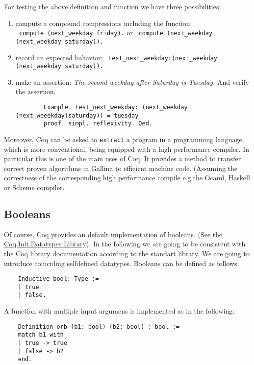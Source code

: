   For testing the above definition and function we have three possibilities:   
   \begin{enumerate}
   \item compute a compound compressions including the function:\\
   \lstinline! compute (next_weekday friday).! or 
   \lstinline! compute (next_weekday (next_weekday saturday)).!
   \item record an expected bahavior: \lstinline! test_next_weekday:(next_weekday (next_weekday saturday)).! 
   \item make an assertion: {\itshape The second weekday after Saturday is Tuesday.} And verify the assertion. 
   \begin{lstlisting}
   		Example. test_next_weekday: (next_weekday (next_weeekday(saturday)) = tuesday 
   		proof. simpl. reflexivity. Qed.
   \end{lstlisting}
   \end{enumerate}   

    Moreover, Coq can be asked to \lstinline!extract! a program in a programming language, which is more conventional, being equipped with a high performance compiler.
    In particular this is one of the main uses of Coq. 
    It provides a method to transfer correct proven algorithms in Gallina to efficient machine code.
    (Assuming the correctness of the corresponding high performance compile e.g.the Ocaml, Haskell or Scheme compiler. 


\subsection{Booleans}

    Of course, Coq provides an default implementation of booleans. (See the \href{https://www.cs.princeton.edu/courses/archive/fall07/cos595/stdlib/html/Coq.Init.Datatypes.html}{Coq.Init.Datatypes Library}). %
    In the following we are going to be consistent with the Coq library documentation according to the standart library. We are going to introduce coinciding selfdefined datatypes.
    Booleans can be defined as follows:
    
    \label{Def:booleans}
    \begin{lstlisting}    
    Inductive bool: Type :=
    | true
    | false.
    \end{lstlisting}
    
    A function with multiple input argumens is implemented as in the following:
    \begin{lstlisting}
    Definition orb (b1: bool) (b2: bool) : bool :=
    match b1 with
    | true -> true
    | false -> b2
    end.
    \end{lstlisting}
     
